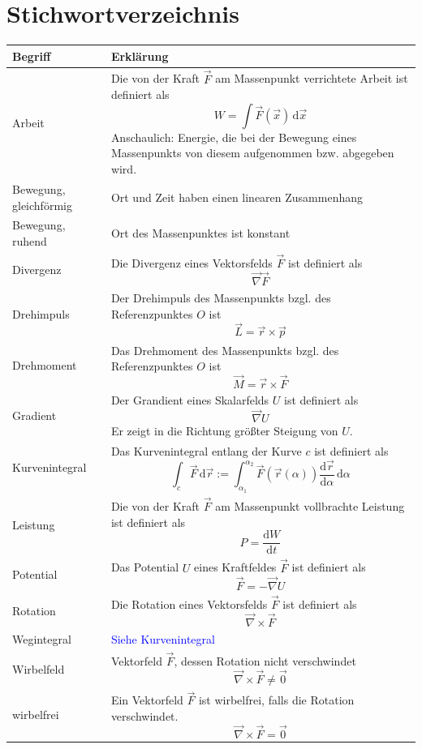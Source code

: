 \documentclass{article}
\newcommand{\diff}{\mathrm{d}}
\begin{document}
\section{Stichwortverzeichnis}
\begin{xltabular}{\linewidth}{p{6cm}|X}
	\hline\hline
		Begriff & Erklärung \\
	\hline
		Arbeit & Die von der Kraft $\vec{F}$ am Massenpunkt verrichtete Arbeit ist definiert als
			$$W = \int \vec{F}(\vec{x})\,\diff \vec{x}$$
		Anschaulich: Energie, die bei der Bewegung eines Massenpunkts von diesem aufgenommen bzw. abgegeben wird. \\
	\hline
		Bewegung, gleichförmig & Ort und Zeit haben einen linearen Zusammenhang \\
	\hline
		Bewegung, ruhend & Ort des Massenpunktes ist konstant \\
	\hline
		Divergenz & Die Divergenz eines Vektorsfelds $\vec{F}$ ist definiert als
			$$\vec{\nabla}\vec{F}$$ \\
	\hline
		Drehimpuls & Der Drehimpuls des Massenpunkts bzgl. des Referenzpunktes $O$ ist
			$$\vec{L} = \vec{r} \times \vec{p}$$ \\
	\hline
		Drehmoment & Das Drehmoment des Massenpunkts bzgl. des Referenzpunktes $O$ ist
			$$\vec{M} = \vec{r} \times \vec{F}$$ \\
	\hline
		Gradient & Der Grandient eines Skalarfelds $U$ ist definiert als
			$$\vec{\nabla}U$$
		Er zeigt in die Richtung größter Steigung von $U$. \\
	\hline
		Kurvenintegral & Das Kurvenintegral entlang der Kurve $c$ ist definiert als
			$$\int_c \vec{F}\,\diff\vec{r} := \int_{\alpha_1}^{\alpha_2} \vec{F}(\vec{r}(\alpha)) \frac{\diff\vec{r}}{\diff\alpha}\,\diff\alpha$$ \\
	\hline
		Leistung & Die von der Kraft $\vec{F}$ am Massenpunkt vollbrachte Leistung ist definiert als
			$$P = \frac{\diff W}{\diff t}$$ \\
	\hline
		Potential & Das Potential $U$ eines Kraftfeldes $\vec{F}$ ist definiert als
			$$\vec{F} = -\vec{\nabla}U$$ \\
	\hline
		Rotation & Die Rotation eines Vektorsfelds $\vec{F}$ ist definiert als
			$$\vec{\nabla} \times \vec{F}$$ \\
	\hline
		Wegintegral & \textcolor{blue}{Siehe Kurvenintegral}\\
	\hline
		Wirbelfeld & Vektorfeld $\vec{F}$, dessen Rotation nicht verschwindet
			$$\vec{\nabla} \times \vec{F} \neq \vec{0}$$ \\
	\hline
		wirbelfrei & Ein Vektorfeld $\vec{F}$ ist wirbelfrei, falls die Rotation verschwindet.
			$$\vec{\nabla} \times \vec{F} = \vec{0}$$ \\
	\hline\hline
\end{xltabular}
\end{document}
